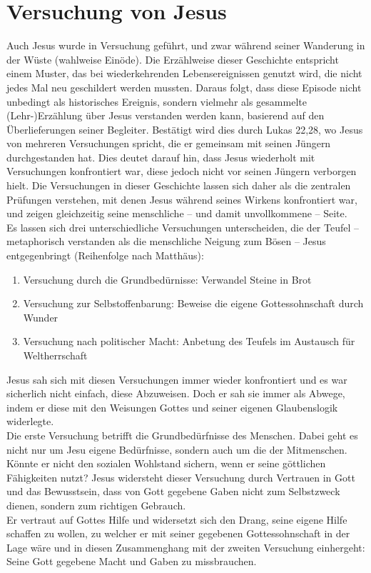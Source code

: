 \section{Versuchung von Jesus}
Auch Jesus wurde in Versuchung geführt, und zwar während seiner Wanderung in der Wüste (wahlweise Einöde). Die Erzählweise dieser Geschichte entspricht einem Muster, das bei wiederkehrenden Lebensereignissen genutzt wird, die nicht jedes Mal neu geschildert werden mussten. Daraus folgt, dass diese Episode nicht unbedingt als historisches Ereignis, sondern vielmehr als gesammelte (Lehr-)Erzählung über Jesus verstanden werden kann, basierend auf den Überlieferungen seiner Begleiter. Bestätigt wird dies durch Lukas 22,28, wo Jesus von mehreren Versuchungen spricht, die er gemeinsam mit seinen Jüngern durchgestanden hat. Dies deutet darauf hin, dass Jesus wiederholt mit Versuchungen konfrontiert war, diese jedoch nicht vor seinen Jüngern verborgen hielt. Die Versuchungen in dieser Geschichte lassen sich daher als die zentralen Prüfungen verstehen, mit denen Jesus während seines Wirkens konfrontiert war, und zeigen gleichzeitig seine menschliche – und damit unvollkommene – Seite.\\

Es lassen sich drei unterschiedliche Versuchungen unterscheiden, die der Teufel – metaphorisch verstanden als die menschliche Neigung zum Bösen – Jesus entgegenbringt (Reihenfolge nach Matthäus):
\begin{enumerate}
    \item Versuchung durch die Grundbedürnisse: Verwandel Steine in Brot
    \item Versuchung zur Selbstoffenbarung: Beweise die eigene Gottessohnschaft durch Wunder
    \item Versuchung nach politischer Macht: Anbetung des Teufels im Austausch für Weltherrschaft
\end{enumerate}
Jesus sah sich mit diesen Versuchungen immer wieder konfrontiert und es war sicherlich nicht einfach, diese Abzuweisen.
Doch er sah sie immer als Abwege, indem er diese mit den Weisungen Gottes und seiner eigenen Glaubenslogik
widerlegte.\\

Die erste Versuchung betrifft die Grundbedürfnisse des Menschen. Dabei geht es nicht nur um Jesu eigene Bedürfnisse, sondern auch um die der Mitmenschen. Könnte er nicht den sozialen Wohlstand sichern, wenn er seine göttlichen Fähigkeiten nutzt? Jesus widersteht dieser Versuchung durch Vertrauen in Gott und das Bewusstsein, dass von Gott gegebene Gaben nicht zum Selbstzweck dienen, sondern zum richtigen Gebrauch.\\ 
Er vertraut auf Gottes Hilfe und widersetzt sich den Drang, seine eigene Hilfe schaffen zu wollen, zu welcher er mit seiner gegebenen Gottessohnschaft in der Lage wäre und in diesen Zusammenghang mit der zweiten Versuchung einhergeht: Seine Gott gegebene Macht und Gaben zu
missbrauchen. \\

